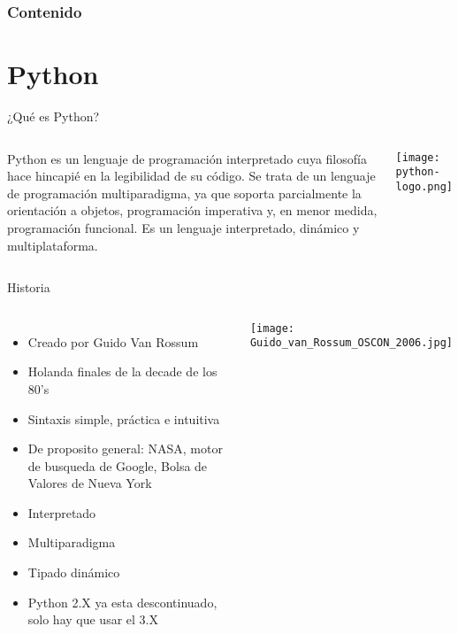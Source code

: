 \begin{frame}
    \frametitle{Contenido}
    \tableofcontents
\end{frame}

\section{Python}

\begin{frame}[c]{¿Qué es Python?}
    \begin{columns}
        Python es un lenguaje de programación interpretado cuya filosofía hace
        hincapié en la legibilidad de su código. Se trata de un lenguaje de
        programación multiparadigma, ya que soporta parcialmente la orientación
        a objetos, programación imperativa y, en menor medida, programación
        funcional. Es un lenguaje interpretado, dinámico y multiplataforma. 
        \begin{center}
            \texttt{[image: python-logo.png]}
        \end{center}
    \end{columns}
\end{frame}

\begin{frame}[c]{Historia}
  \begin{columns}
    \begin{itemize}
      \item Creado por Guido Van Rossum
      \item Holanda finales de la decade de los 80's
      \item Sintaxis simple, práctica e intuitiva
      \item De proposito general: NASA, motor de busqueda de Google, Bolsa de
        Valores de Nueva York
      \item Interpretado
      \item Multiparadigma
      \item Tipado dinámico
      \item Python 2.X ya esta descontinuado, solo hay que usar el 3.X
    \end{itemize}
        \begin{center}
            \texttt{[image: Guido\_van\_Rossum\_OSCON\_2006.jpg]}
        \end{center}
  \end{columns}
\end{frame}

